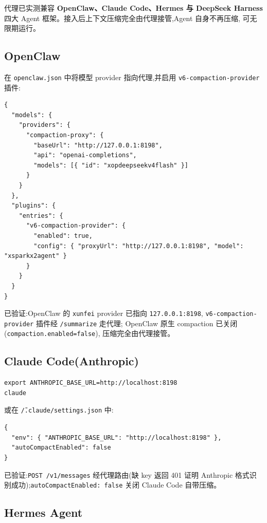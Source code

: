 \documentclass[11pt,a4paper]{article}
\begin{document}
代理已实测兼容 \textbf{OpenClaw、Claude Code、Hermes 与 DeepSeek Harness}
四大 Agent 框架。接入后上下文压缩完全由代理接管,Agent 自身不再压缩,
可无限期运行。

\subsection{OpenClaw}

在 \texttt{openclaw.json} 中将模型 provider 指向代理,并启用
\texttt{v6-compaction-provider} 插件:

\begin{lstlisting}[language={}]
{
  "models": {
    "providers": {
      "compaction-proxy": {
        "baseUrl": "http://127.0.0.1:8198",
        "api": "openai-completions",
        "models": [{ "id": "xopdeepseekv4flash" }]
      }
    }
  },
  "plugins": {
    "entries": {
      "v6-compaction-provider": {
        "enabled": true,
        "config": { "proxyUrl": "http://127.0.0.1:8198", "model": "xsparkx2agent" }
      }
    }
  }
}
\end{lstlisting}

已验证:OpenClaw 的 \texttt{xunfei} provider 已指向 \texttt{127.0.0.1:8198},
\texttt{v6-compaction-provider} 插件经 \texttt{/summarize} 走代理;
OpenClaw 原生 compaction 已关闭(\texttt{compaction.enabled=false}),
压缩完全由代理接管。

\subsection{Claude Code(Anthropic)}

\begin{lstlisting}
export ANTHROPIC_BASE_URL=http://localhost:8198
claude
\end{lstlisting}

或在 \texttt{\~/.claude/settings.json} 中:

\begin{lstlisting}[language={}]
{
  "env": { "ANTHROPIC_BASE_URL": "http://localhost:8198" },
  "autoCompactEnabled": false
}
\end{lstlisting}

已验证:\texttt{POST /v1/messages} 经代理路由(缺 key 返回 401 证明
Anthropic 格式识别成功);\texttt{autoCompactEnabled: false} 关闭
Claude Code 自带压缩。

\subsection{Hermes Agent}
\end{document}
